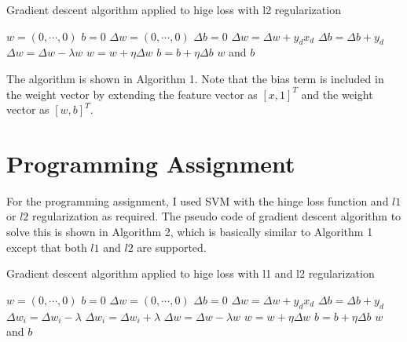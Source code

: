 \begin{enumerate}
\begin{enumerate}
\begin{algorithm}
\caption{Gradient descent algorithm applied to hige loss with l2 regularization}\label{euclid}
\begin{algorithmic}[1]
\State $w=(0, \cdots, 0)$
\State $b=0$
\State $\Delta w=(0, \cdots, 0)$
\State $\Delta b=0$
\State $\Delta w= \Delta w+y_d x_d$
\State $\Delta b=\Delta b+y_d$
\EndIf
\EndFor
\State $\Delta w=\Delta w - \lambda w$
\State $w=w+\eta \Delta w$
\State $b=b+\eta \Delta b$
\EndFor
\State \Return $w$ and $b$
\EndProcedure
\end{algorithmic}
\end{algorithm}

The algorithm is shown in Algorithm 1. Note that the bias term is included in the weight vector by extending the feature vector as $[x, 1]^T$ and the weight vector as $[w, b]^T$.



\end{enumerate}

\end{enumerate}

\section{Programming Assignment}

For the programming assignment, I used SVM with the hinge loss function and $l1$ or $l2$ regularization as required. The pseudo code of gradient descent algorithm to solve this is shown in Algorithm 2, which is basically similar to Algorithm 1 except that both $l1$ and $l2$ are supported.

\begin{algorithm}
\caption{Gradient descent algorithm applied to hige loss with l1 and l2 regularization}\label{euclid}
\begin{algorithmic}[1]
\State $w=(0, \cdots, 0)$
\State $b=0$
\State $\Delta w=(0, \cdots, 0)$
\State $\Delta b=0$
\State $\Delta w= \Delta w+y_d x_d$
\State $\Delta b=\Delta b+y_d$
\EndIf
\EndFor
{}
\State $\Delta w_i=\Delta w_i-\lambda$
\Else
\State $\Delta w_i=\Delta w_i+\lambda$
\EndIf
\EndFor
{}
\State $\Delta w=\Delta w - \lambda w$
\EndIf
\State $w=w+\eta \Delta w$
\State $b=b+\eta \Delta b$
\EndFor
\State \Return $w$ and $b$
\EndProcedure
\end{algorithmic}
\end{algorithm}

